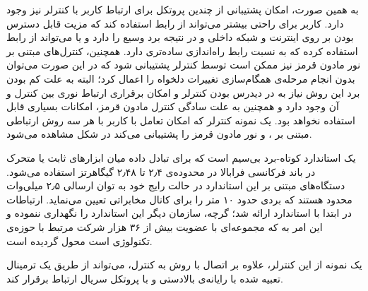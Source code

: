 به همین صورت، امکان پشتیبانی از چندین پروتکل برای ارتباط کاربر با کنترلر نیز وجود دارد. کاربر برای راحتی بیشتر می‌تواند از رابط  استفاده کند که مزیت قابل دسترس بودن بر روی اینترنت و شبکه داخلی و در نتیجه برد وسیع را دارد و یا می‌تواند از رابط استفاده کرده که به نسبت رابط  راه‌اندازی ساده‌تری دارد. همچنین، کنترل‌های مبتنی بر نور مادون قرمز نیز ممکن است توسط کنترلر پشتیبانی شود که در این صورت می‌توان بدون انجام مرحله‌ی همگام‌سازی تغییرات دلخواه را اعمال کرد؛ البته به علت کم بودن برد این روش نیاز به در دیدرس بودن کنترلر و امکان برقراری ارتباط نوری بین کنترل و آن وجود دارد و همچنین به علت سادگی کنترل مادون قرمز، امکانات بسیاری قابل استفاده نخواهد بود. یک نمونه کنترلر که امکان تعامل با کاربر با هر سه روش ارتباطی مبتنی بر ، و نور مادون قرمز را پشتیبانی می‌کند در شکل  مشاهده می‌شود.

یک استاندارد کوتاه-برد بی‌سیم است که برای تبادل داده میان ابزارهای ثابت یا متحرک در باند فرکانسی فرابالا  در محدوده‌ی ۲٫۴ تا ۲٫۴۸ گیگاهرتز استفاده می‌شود. دستگاه‌های مبتنی بر این استاندارد در حالت رایج خود به توان ارسالی ۲٫۵ میلی‌وات محدود هستند که بردی حدود ۱۰ متر را برای کانال مخابراتی تعیین می‌نماید. ارتباطات در ابتدا با استاندارد  ارائه شد؛ گرچه، سازمان  دیگر این استاندارد را نگهداری ننموده و این امر به  که مجموعه‌ای با عضویت بیش از ۳۶ هزار شرکت مرتبط با حوزه‌ی تکنولوژی است محول گردیده است.

یک نمونه از این کنترلر، علاوه بر اتصال با روش به کنترل، می‌تواند از طریق یک ترمینال تعبیه شده با رایانه‌ی بالادستی و با پروتکل سریال ارتباط برقرار کند.

